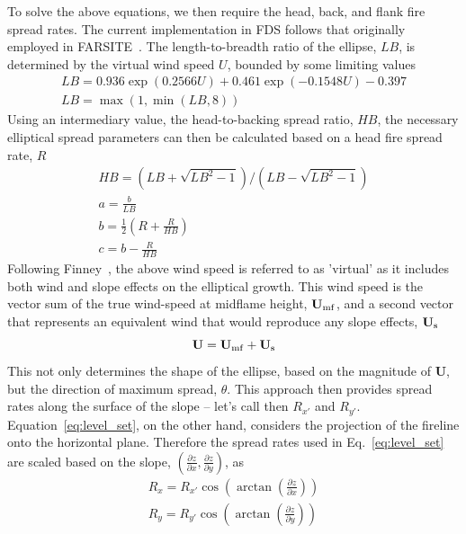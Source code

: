 To solve the above equations, we then require the head, back, and flank fire spread rates. The current implementation in FDS follows that originally employed in FARSITE~\cite{Finney:FARSITE}. The length-to-breadth ratio of the ellipse, $L B$, is determined by the virtual wind speed $U$, bounded by some limiting values
\begin{gather}
L B=0.936 \exp (0.2566 U)+0.461 \exp (-0.1548 U)-0.397 \\[8pt]
L B=\max (1, \min (L B, 8))
\end{gather}
Using an intermediary value, the head-to-backing spread ratio, $H B$, the necessary elliptical spread parameters can then be calculated based on a head fire spread rate, $R$
\begin{gather}
H B = \left(L B+\sqrt{L B^{2}-1}\right) /\left(L B-\sqrt{L B^{2}-1}\right) \\[8pt]
a = \frac{b}{L B} \\[8pt]
b = \frac{1}{2}\left(R+\frac{R}{H B}\right) \\[8pt]
c = b-\frac{R}{H B}
\end{gather}
Following Finney~\cite{Finney:FARSITE}, the above wind speed is referred to as 'virtual' as it includes both wind and slope effects on the elliptical growth. This wind speed is the vector sum of the true wind-speed at midflame height, $\mathbf{U}_{\rm mf}$, and a second vector that represents an equivalent wind that would reproduce any slope effects, $\mathbf{U}_{\rm s}$ 
\begin{equation}
\mathbf{U} = \mathbf{U}_{\rm mf} + \mathbf{U}_{\rm s}
\end{equation}
This not only determines the shape of the ellipse, based on the magnitude of $\mathbf{U}$, but the direction of maximum spread, $\theta$. This approach then provides spread rates along the surface of the slope -- let's call then $R_{x'}$ and $R_{y'}$. Equation~\ref{eq:level_set}, on the other hand, considers the projection of the fireline onto the horizontal plane. Therefore the spread rates used in Eq.~\ref{eq:level_set} are scaled based on the slope, $\left(\frac{\partial z}{\partial x},\frac{\partial z}{\partial y}\right)$, as
\begin{gather}
R_x = R_{x'} \cos \left(\arctan \left(\frac{\partial z}{\partial x}\right)\right) \\[8pt]
R_y = R_{y'} \cos \left(\arctan \left(\frac{\partial z}{\partial y}\right)\right) \\[8pt]
\end{gather}

